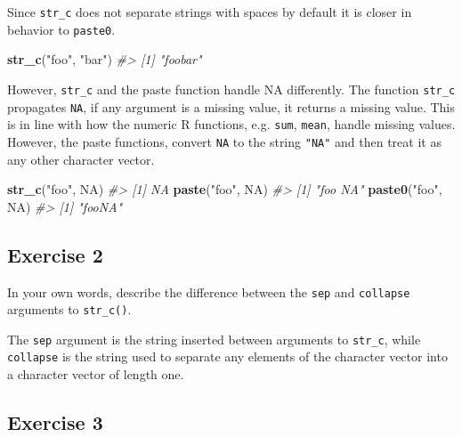 \documentclass[]{book}
\newenvironment{Shaded}{\begin{snugshade}}{\end{snugshade}}
\newcommand{\CommentTok}[1]{\textcolor[rgb]{0.56,0.35,0.01}{\textit{#1}}}
\newcommand{\KeywordTok}[1]{\textcolor[rgb]{0.13,0.29,0.53}{\textbf{#1}}}
\newcommand{\NormalTok}[1]{#1}
\newcommand{\OtherTok}[1]{\textcolor[rgb]{0.56,0.35,0.01}{#1}}
\newcommand{\StringTok}[1]{\textcolor[rgb]{0.31,0.60,0.02}{#1}}
\theoremstyle{definition}
\theoremstyle{definition}
\theoremstyle{definition}
\theoremstyle{remark}
\begin{document}
Since \texttt{str\_c} does not separate strings with spaces by default
it is closer in behavior to \texttt{paste0}.

\begin{Shaded}
\begin{Highlighting}[]
\KeywordTok{str_c}\NormalTok{(}\StringTok{"foo"}\NormalTok{, }\StringTok{"bar"}\NormalTok{)}
\CommentTok{#> [1] "foobar"}
\end{Highlighting}
\end{Shaded}

However, \texttt{str\_c} and the paste function handle NA differently.
The function \texttt{str\_c} propagates \texttt{NA}, if any argument is
a missing value, it returns a missing value. This is in line with how
the numeric R functions, e.g. \texttt{sum}, \texttt{mean}, handle
missing values. However, the paste functions, convert \texttt{NA} to the
string \texttt{"NA"} and then treat it as any other character vector.

\begin{Shaded}
\begin{Highlighting}[]
\KeywordTok{str_c}\NormalTok{(}\StringTok{"foo"}\NormalTok{, }\OtherTok{NA}\NormalTok{)}
\CommentTok{#> [1] NA}
\KeywordTok{paste}\NormalTok{(}\StringTok{"foo"}\NormalTok{, }\OtherTok{NA}\NormalTok{)}
\CommentTok{#> [1] "foo NA"}
\KeywordTok{paste0}\NormalTok{(}\StringTok{"foo"}\NormalTok{, }\OtherTok{NA}\NormalTok{)}
\CommentTok{#> [1] "fooNA"}
\end{Highlighting}
\end{Shaded}

\hypertarget{exercise-2-24}{%
\subsection{Exercise 2}\label{exercise-2-24}}

In your own words, describe the difference between the \texttt{sep} and
\texttt{collapse} arguments to \texttt{str\_c()}.

The \texttt{sep} argument is the string inserted between arguments to
\texttt{str\_c}, while \texttt{collapse} is the string used to separate
any elements of the character vector into a character vector of length
one.

\hypertarget{exercise-3-21}{%
\subsection{Exercise 3}\label{exercise-3-21}}
\end{document}
